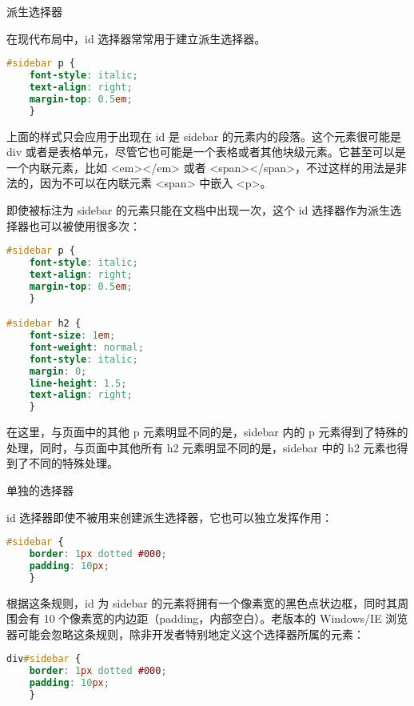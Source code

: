 \begin{compactitem}
\item 派生选择器



在现代布局中，id 选择器常常用于建立派生选择器。

\begin{lstlisting}[language=CSS]
#sidebar p {
	font-style: italic;
	text-align: right;
	margin-top: 0.5em;
	}
\end{lstlisting}

上面的样式只会应用于出现在 id 是 sidebar 的元素内的段落。这个元素很可能是 div 或者是表格单元，尽管它也可能是一个表格或者其他块级元素。它甚至可以是一个内联元素，比如 <em></em> 或者 <span></span>，不过这样的用法是非法的，因为不可以在内联元素 <span> 中嵌入 <p>。

即使被标注为 sidebar 的元素只能在文档中出现一次，这个 id 选择器作为派生选择器也可以被使用很多次：

\begin{lstlisting}[language=CSS]
#sidebar p {
	font-style: italic;
	text-align: right;
	margin-top: 0.5em;
	}

#sidebar h2 {
	font-size: 1em;
	font-weight: normal;
	font-style: italic;
	margin: 0;
	line-height: 1.5;
	text-align: right;
	}
\end{lstlisting}


在这里，与页面中的其他 p 元素明显不同的是，sidebar 内的 p 元素得到了特殊的处理，同时，与页面中其他所有 h2 元素明显不同的是，sidebar 中的 h2 元素也得到了不同的特殊处理。

\item 单独的选择器

id 选择器即使不被用来创建派生选择器，它也可以独立发挥作用：

\begin{lstlisting}[language=CSS]
#sidebar {
	border: 1px dotted #000;
	padding: 10px;
	}
\end{lstlisting}

根据这条规则，id 为 sidebar 的元素将拥有一个像素宽的黑色点状边框，同时其周围会有 10 个像素宽的内边距（padding，内部空白）。老版本的 Windows/IE 浏览器可能会忽略这条规则，除非开发者特别地定义这个选择器所属的元素：

\begin{lstlisting}[language=CSS]
div#sidebar {
	border: 1px dotted #000;
	padding: 10px;
	}
\end{lstlisting}

\end{compactitem}





